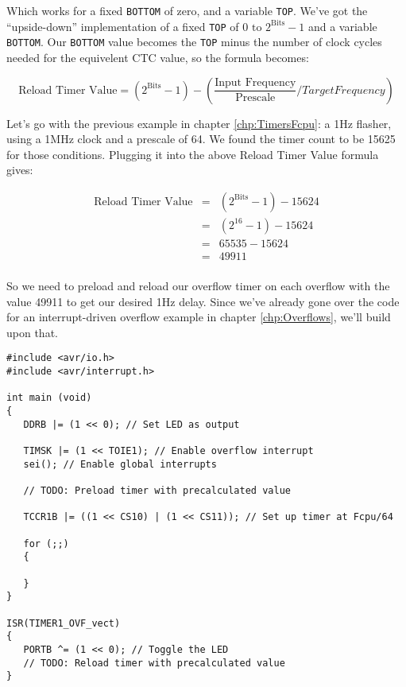 \documentclass[a4paper,oneside]{book}
\begin{document}
Which works for a fixed \texttt{BOTTOM} of zero, and a variable \texttt{TOP}. We've got the ``upside-down'' implementation of a fixed \texttt{TOP} of \(0 \text{ to } 2^\text{Bits}-1\) and a variable \texttt{BOTTOM}. Our \texttt{BOTTOM} value becomes the \texttt{TOP} minus the number of clock cycles needed for the equivelent CTC value, so the formula becomes: 

\begin{displaymath}
\text{Reload Timer Value} = (2^\text{Bits} - 1) - (\frac{\text{Input Frequency}}{\text{Prescale}} / Target Frequency) 
\end{displaymath}

Let's go with the previous example in chapter \ref{chp:TimersFcpu}: a 1Hz flasher, using a 1MHz clock and a prescale of 64. We found the timer count to be 15625 for those conditions. Plugging it into the above Reload Timer Value formula gives: 

\begin{displaymath}
\begin{array}{rcl}
\text{Reload Timer Value} & = & (2^\text{Bits} - 1) - 15624 \\
                          & = & (2^{16} - 1) - 15624 \\
                          & = & 65535 - 15624 \\
                          & = & 49911 \\
\end{array}
\end{displaymath}

So we need to preload and reload our overflow timer on each overflow with the value 49911 to get our desired 1Hz delay. Since we've already gone over the code for an interrupt-driven overflow example in chapter \ref{chp:Overflows}, we'll build upon that.

\begin{center}
\begin{lstlisting}
#include <avr/io.h>
#include <avr/interrupt.h>

int main (void)
{
   DDRB |= (1 << 0); // Set LED as output

   TIMSK |= (1 << TOIE1); // Enable overflow interrupt
   sei(); // Enable global interrupts

   // TODO: Preload timer with precalculated value

   TCCR1B |= ((1 << CS10) | (1 << CS11)); // Set up timer at Fcpu/64

   for (;;)
   {

   }
}

ISR(TIMER1_OVF_vect)
{
   PORTB ^= (1 << 0); // Toggle the LED
   // TODO: Reload timer with precalculated value
} 
\end{lstlisting}
\end{center}
\end{document}

